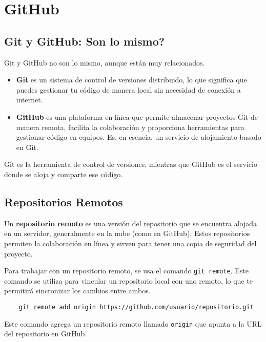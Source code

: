 \section{GitHub}

    \subsection{Git y GitHub: Son lo mismo?}

        Git y GitHub no son lo mismo, aunque est\'an muy relacionados.

        \begin{itemize}
            \item \textbf{Git} es un sistema de control de versiones distribuido, lo que significa que puedes gestionar tu c\'odigo de manera local sin necesidad de conexi\'on a internet. 
            \item \textbf{GitHub} es una plataforma en l\'inea que permite almacenar proyectos Git de manera remota, facilita la colaboraci\'on y proporciona herramientas para gestionar c\'odigo en equipos. Es, en esencia, un servicio de alojamiento basado en Git.
        \end{itemize}

        Git es la herramienta de control de versiones, mientras que GitHub es el servicio donde se aloja y comparte ese c\'odigo.



    \subsection{Repositorios Remotos}

        Un \textbf{repositorio remoto} es una versi\'on del repositorio que se encuentra alojada en un servidor, generalmente en la nube (como en GitHub). Estos repositorios permiten la colaboraci\'on en l\'inea y sirven para tener una copia de seguridad del proyecto.

        Para trabajar con un repositorio remoto, se usa el comando \texttt{git remote}. Este comando se utiliza para vincular un repositorio local con uno remoto, lo que te permitir\'a sincronizar los cambios entre ambos.

        \begin{lstlisting}
    git remote add origin https://github.com/usuario/repositorio.git
        \end{lstlisting}

        Este comando agrega un repositorio remoto llamado \texttt{origin} que apunta a la URL del repositorio en GitHub.



